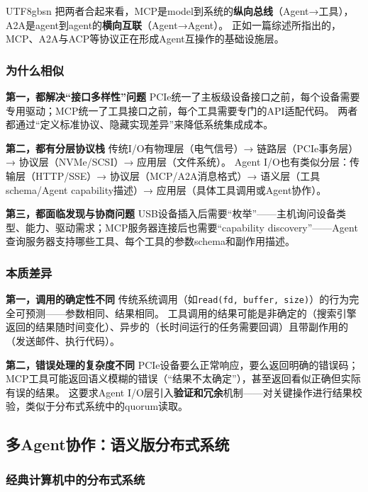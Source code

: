 \documentclass[11pt,a4paper]{article}
\begin{document}
\begin{CJK*}{UTF8}{gbsn}
把两者合起来看，MCP是model到系统的\textbf{纵向总线}（Agent→工具），A2A是agent到agent的\textbf{横向互联}（Agent→Agent）。
正如一篇综述所指出的，MCP、A2A与ACP等协议正在形成Agent互操作的基础设施层\cite{agentprotocols2025}。

\subsubsection{为什么相似}

\textbf{第一，都解决``接口多样性''问题}
PCIe统一了主板级设备接口之前，每个设备需要专用驱动；MCP统一了工具接口之前，每个工具需要专门的API适配代码。
两者都通过``定义标准协议、隐藏实现差异''来降低系统集成成本。

\textbf{第二，都有分层协议栈}
传统I/O有物理层（电气信号）→ 链路层（PCIe事务层）→ 协议层（NVMe/SCSI）→ 应用层（文件系统）。
Agent I/O也有类似分层：传输层（HTTP/SSE）→ 协议层（MCP/A2A消息格式）→ 语义层（工具schema/Agent capability描述）→ 应用层（具体工具调用或Agent协作）。

\textbf{第三，都面临发现与协商问题}
USB设备插入后需要``枚举''——主机询问设备类型、能力、驱动需求；MCP服务器连接后也需要``capability discovery''——Agent查询服务器支持哪些工具、每个工具的参数schema和副作用描述。

\subsubsection{本质差异}

\textbf{第一，调用的确定性不同}
传统系统调用（如\texttt{read(fd, buffer, size)}）的行为完全可预测——参数相同、结果相同。
工具调用的结果可能是非确定的（搜索引擎返回的结果随时间变化）、异步的（长时间运行的任务需要回调）且带副作用的（发送邮件、执行代码）。

\textbf{第二，错误处理的复杂度不同}
PCIe设备要么正常响应，要么返回明确的错误码；MCP工具可能返回语义模糊的错误（``结果不太确定''），甚至返回看似正确但实际有误的结果。
这要求Agent I/O层引入\textbf{验证和冗余}机制——对关键操作进行结果校验，类似于分布式系统中的quorum读取。

\subsection{多Agent协作：语义版分布式系统}
\label{sec:distributed}

\subsubsection{经典计算机中的分布式系统}


\end{CJK*}
\end{document}
